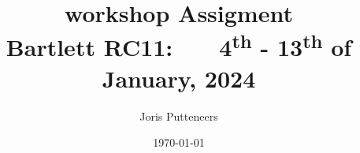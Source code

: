 


\title{\textbf{\LARGE workshop Assigment}\\[1ex] \large Bartlett RC11: \  \  \ 4\textsuperscript{th} - 13\textsuperscript{th} of January, 2024}

\author{Joris Putteneers}
\date{\today}




\maketitle

\part{}




\vspace{10pt}
\part{}




\vspace{10pt}
\part{}




\vspace{10pt}
\part{}






